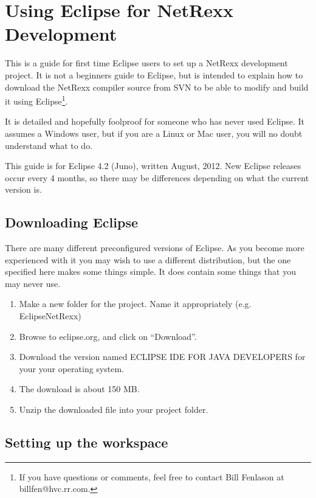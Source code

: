 \chapter{Using Eclipse for NetRexx Development}
 
This is a guide for first time Eclipse users to set up a NetRexx
development project.  It is not a beginners guide to Eclipse, but is
intended to explain how to download the NetRexx compiler source from
SVN to be able to modify and build it using Eclipse\footnote{If you
  have questions or comments, feel free to contact Bill Fenlason at billfen@hvc.rr.com.}.
 
It is detailed and hopefully foolproof for someone who has never used
Eclipse.  It assumes a Windows user, but if you are a Linux or Mac
user, you will no doubt understand what to do.
 
This guide is for Eclipse 4.2 (Juno), written August, 2012.  New
Eclipse releases occur every 4 months, so there may be differences
depending on what the current version is.
 
\section{Downloading Eclipse}
 
There are many different preconfigured versions of Eclipse.  As you
become more experienced with it you may wish to use a different
distribution, but the one specified here makes some things simple.  It
does contain some things that you may never use.
\begin{enumerate}
\item Make a new folder for the project.  Name it appropriately
   (e.g. EclipseNetRexx)
\item Browse to eclipse.org, and click on ``Download''.
\item Download the version named ECLIPSE IDE FOR JAVA DEVELOPERS for your
   your operating system.
\item The download is about 150 MB.
\item Unzip the downloaded file into your project folder.
\end{enumerate}
\section{Setting up the workspace}
 
